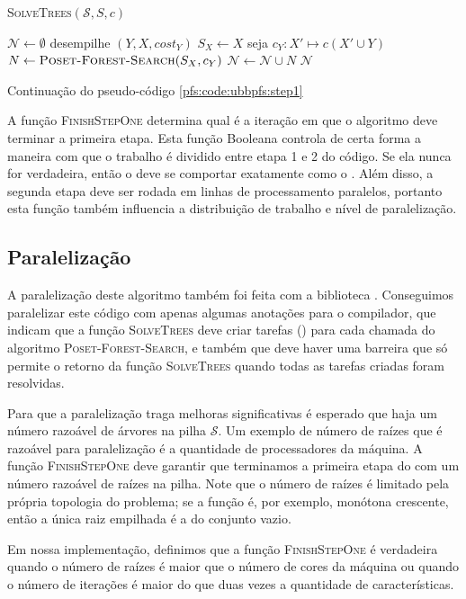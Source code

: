 \begin{algorithm}[!ht]
\textsc{SolveTrees}$(\mathcal{S}, S, c)$
\begin{algorithmic}[1]
    \State $\mathcal{N} \gets \emptyset$
        \State desempilhe $(Y, X, cost_Y)$
        \State $S_X \gets X$
        \State seja $c_Y: X' \mapsto c (X' \cup Y)$
        \State $N \gets {\normalfont\textsc{Poset-Forest-Search}} (S_X, c_Y)$
        \State $\mathcal{N} \gets \mathcal{N} \cup N$
    \EndWhile
    \Return $\mathcal{N}$
\end{algorithmic}
\caption{Continuação do pseudo-código \ref{pfs:code:ubbpfs:step1}}
\end{algorithm}

A função \textsc{FinishStepOne} determina qual é a iteração em que o
algoritmo deve terminar a primeira etapa. Esta função Booleana controla
de certa forma a maneira com que o trabalho é dividido entre etapa 1 e 2
do código. Se ela nunca for verdadeira, então o  deve 
se comportar exatamente como o . Além disso, a segunda 
etapa deve ser rodada em linhas de processamento paralelos, portanto
esta função também influencia a distribuição de trabalho e nível de 
paralelização.

\subsection{Paralelização}
A paralelização deste algoritmo também foi feita com a biblioteca 
. Conseguimos paralelizar este código com apenas 
algumas anotações para o compilador, que indicam que a função
\textsc{SolveTrees} deve criar tarefas () para cada 
chamada do algoritmo \textsc{Poset-Forest-Search}, e também que deve 
haver uma barreira que só permite o retorno da função 
\textsc{SolveTrees} quando todas as tarefas criadas foram resolvidas.

Para que a paralelização traga melhoras significativas é esperado que
haja um número razoável de árvores na pilha $\mathcal{S}$. Um exemplo de
número de raízes que é razoável para paralelização é a quantidade de
processadores da máquina. A função \textsc{FinishStepOne} deve garantir
que terminamos a primeira etapa do  com um número
razoável de raízes na pilha. Note que o número de raízes é limitado
pela própria topologia do problema; se a função é, por exemplo, monótona
crescente, então a única raiz empilhada é a do conjunto vazio.

Em nossa implementação, definimos que a função \textsc{FinishStepOne} é
verdadeira quando o número de raízes é maior que o número de cores da 
máquina ou quando o número de iterações é maior do que duas vezes a 
quantidade de características. 
